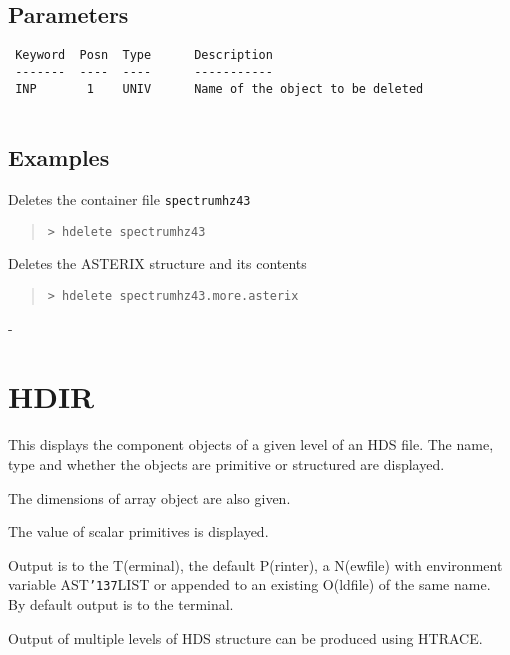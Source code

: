 \documentclass{book}
\renewcommand{\_}{{\tt\char'137}}     %
\begin{document}
\subsection{Parameters}
\begin{verbatim}
 Keyword  Posn  Type      Description
 -------  ----  ----      -----------
 INP       1    UNIV      Name of the object to be deleted
 
\end{verbatim}\subsection{Examples}
Deletes the container file {\tt spectrumhz43}
\begin{quote}\begin{verbatim}
> hdelete spectrumhz43
\end{verbatim}\end{quote}
Deletes the ASTERIX structure and its contents
\begin{quote}\begin{verbatim}
> hdelete spectrumhz43.more.asterix
\end{verbatim}\end{quote}
-
\section{HDIR}
This displays the component objects of a given level of
an HDS file. The name, type and whether the objects are
primitive or structured are displayed.
 
The dimensions of array object are also given.
 
The value of scalar primitives is displayed.
 
Output is to the T(erminal), the default P(rinter), a N(ewfile)
with environment variable AST\_LIST or appended to an existing O(ldfile)
of the same name. By default output is to the terminal.
 
Output of multiple levels of HDS structure can be produced using HTRACE.
 
\end{document}
